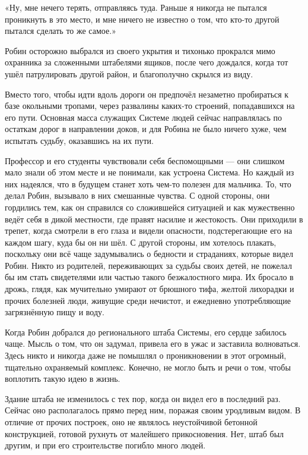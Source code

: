\documentclass[a4paper,12pt]{book}
\begin{document}
\par
«Ну, мне нечего терять, отправляясь туда. Раньше я никогда не пытался проникнуть в это место, и мне ничего не известно о том, что кто-то другой пытался сделать то же самое.»\\
\par
Робин осторожно выбрался из своего укрытия и тихонько прокрался мимо охранника за сложенными штабелями ящиков, после чего дождался, когда тот ушёл патрулировать другой район, и благополучно скрылся из виду.
\par
Вместо того, чтобы идти вдоль дороги он предпочёл незаметно пробираться к базе окольными тропами, через развалины каких-то строений, попадавшихся на его пути. Основная масса служащих Системе людей сейчас направлялась по остаткам дорог в направлении доков, и для Робина не было ничего хуже, чем испытать судьбу, оказавшись на их пути.
\par
Профессор и его студенты чувствовали себя беспомощными — они слишком мало знали об этом месте и не понимали, как устроена Система. Но каждый из них надеялся, что в будущем станет хоть чем-то полезен для мальчика. То, что делал Робин, вызывало в них смешанные чувства. С одной стороны, они гордились тем, как он справился со сложившейся ситуацией и как мужественно ведёт себя в дикой местности, где правят насилие и жестокость. Они приходили в трепет, когда смотрели в его глаза и видели опасности, подстерегающие его на каждом шагу, куда бы он ни шёл. С другой стороны, им хотелось плакать, поскольку они всё чаще задумывались о бедности и страданиях, которые видел Робин. Никто из родителей, переживающих за судьбы своих детей, не пожелал бы им стать свидетелями или частью такого безжалостного мира. Их бросало в дрожь, глядя, как мучительно умирают от брюшного тифа, желтой лихорадки и прочих болезней люди, живущие среди нечистот, и ежедневно употребляющие загрязнённую пищу и воду.\\
\par
Когда Робин добрался до регионального штаба Системы, его сердце забилось чаще. Мысль о том, что он задумал, привела его в ужас и заставила волноваться. Здесь никто и никогда даже не помышлял о проникновении в этот огромный, тщательно охраняемый комплекс. Конечно, не могло быть и речи о том, чтобы воплотить такую идею в жизнь.
\par
Здание штаба не изменилось с тех пор, когда он видел его в последний раз. Сейчас оно располагалось прямо перед ним, поражая своим уродливым видом. В отличие от прочих построек, оно не являлось неустойчивой бетонной конструкцией, готовой рухнуть от малейшего прикосновения. Нет, штаб был другим, и при его строительстве погибло много людей.
\end{document}
